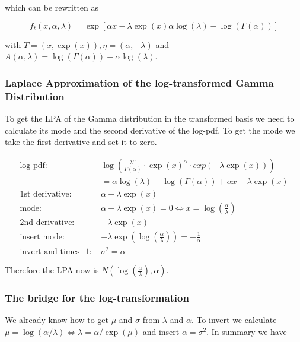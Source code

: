 which can be rewritten as

\begin{equation}
	f_t(x, \alpha, \lambda) = \exp \left[\alpha x - \lambda \exp(x) \alpha \log(\lambda) - \log(\Gamma(\alpha))\right]	
	\label{eq:exp_gamma_trans}
\end{equation}

with $T = (x, \exp(x)), \eta = (\alpha, -\lambda)$ and $A(\alpha, \lambda) = \log(\Gamma(\alpha)) - \alpha  \log(\lambda)$. 


\subsubsection{Laplace Approximation of the log-transformed Gamma Distribution}

To get the LPA of the Gamma distribution in the transformed basis we need to calculate its mode and the second derivative of the log-pdf. To get the mode we take the first derivative and set it to zero. 

\begin{align*}
\text{log-pdf: } &\log\left(\frac{\lambda^\alpha}{\Gamma(\alpha)} \cdot \exp(x)^{\alpha} \cdot exp(-\lambda \exp(x)) \right) \\
&= \alpha \log(\lambda) - \log(\Gamma(\alpha)) + \alpha x - \lambda \exp(x)\\
\text{1st derivative: }&  \alpha - \lambda \exp(x)\\
\text{mode: }& \alpha - \lambda \exp(x) = 0 \Leftrightarrow x = \log\left(\frac{\alpha}{\lambda}\right)\\
\text{2nd derivative: }&  -\lambda \exp(x)\\
\text{insert mode: }& -\lambda \exp(\log\left(\frac{\alpha}{\lambda}\right)) = -\frac{1}{\alpha} \\
\text{invert and times -1: }&\sigma^2 = \alpha 
\end{align*}

Therefore the LPA now is $N(\log\left(\frac{\alpha}{\lambda}\right), \alpha)$.

\subsubsection{The bridge for the log-transformation}

We already know how to get $\mu$ and $\sigma$ from $\lambda$ and $\alpha$. To invert we calculate $\mu = \log(\alpha/\lambda) \Leftrightarrow \lambda= \alpha/\exp(\mu)$ and insert $\alpha=\sigma^2$. In summary we have

